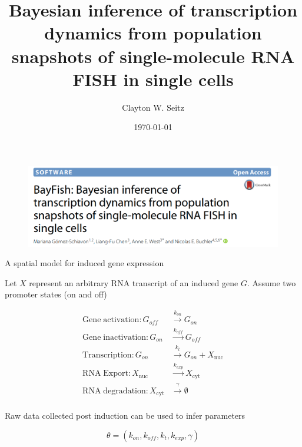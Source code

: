 \documentclass[aspectratio=1610]{beamer}					%
\title{Bayesian inference of transcription dynamics from population snapshots of single-molecule RNA FISH in single cells}	%
\author{Clayton W. Seitz}								%
\date{\today}									%
\begin{document}
\begin{frame}
  \titlepage
\end{frame}


%

\begin{frame}
\begin{figure}
\includegraphics[width=14cm]{title.png}
\end{figure}
\end{frame}

\begin{frame}{A spatial model for induced gene expression}

Let $X$ represent an arbitrary RNA transcript of an induced gene $G$. Assume two promoter states (on and off)

\begin{align*}
\mathrm{Gene\;activation}: G_{off} &\overset{k_{on}}{\rightarrow} G_{on}\\
\mathrm{Gene\;inactivation}: G_{on} &\overset{k_{off}}{\rightarrow} G_{off}\\
\mathrm{Transcription}: G_{on} &\overset{k_{t}}{\rightarrow} G_{on} + X_{\mathrm{nuc}}\\
\mathrm{RNA \;Export}: X_{\mathrm{nuc}} &\overset{k_{exp}}{\rightarrow} X_{\mathrm{cyt}}\\
\mathrm{RNA\; degradation}: X_{\mathrm{cyt}} &\overset{\gamma}{\rightarrow} \emptyset\\
\end{align*}

Raw data collected post induction can be used to infer parameters

\begin{equation*}
\theta = \left( k_{on},k_{off},k_{t},k_{exp},\gamma\right)
\end{equation*}

\end{frame}
\end{document}
